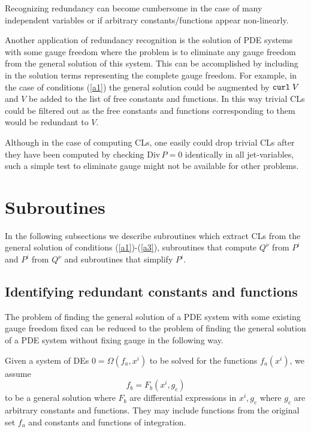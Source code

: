 Recognizing redundancy can become cumbersome in the case of many
independent variables or if arbitrary constants/functions appear
non-linearly.

Another application of redundancy recognition is the solution of
PDE systems with some gauge freedom where the problem is to eliminate
any gauge freedom from the general solution of this system. This
can be accomplished by including in the solution
terms representing the complete gauge freedom.
For example, in the case of conditions (\ref{a1}) the general
solution could be augmented by ${\tt curl}\; V$ and $V$ be added
to the list of free constants and functions.
In this way trivial CLs could be filtered
out as the free constants and functions corresponding to them
would be redundant to $V$.

Although in the case of computing CLs, one easily could drop
trivial CLs after they have been computed by checking
$\mbox{Div}\,P = 0$ identically in all jet-variables,
such a simple test to eliminate gauge might not be available
for other problems.

\section{Subroutines}
In the following subsections we describe subroutines which
extract CLs from the general solution of conditions
(\ref{a1})-(\ref{a3}), subroutines that compute $Q^{\nu}$ from
$P^i$ and $P^i$ from $Q^{\nu}$ and subroutines that simplify $P^i$.

\subsection{Identifying redundant constants and functions}
The problem of finding the general solution of a PDE system with
some existing gauge freedom fixed can be reduced to the problem
of finding the general solution of a PDE system without fixing
gauge in the following way.

Given a system of DEs $0 = \Omega(f_a,x^i)$ to be solved for the
functions $f_a(x^i)$, we assume
\begin{equation}
f_b = F_b(x^i,g_c) \label{c0}
\end{equation}
to be a general solution where $F_b$ are differential expressions in
$x^i,g_c$ where $g_c$ are arbitrary constants and functions.
They may include functions from the original set $f_a$
and constants and functions of integration.

